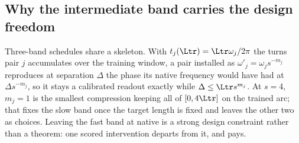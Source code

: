 
\subsection{Why the intermediate band carries the design freedom}
\label{sec:three-band-chain}

Three-band schedules share a skeleton. With $t_j(\Ltr)=\Ltr\omega_j/2\pi$ the turns pair $j$
accumulates over the training window, a pair installed as $\omega'_j=\omega_j s^{-m_j}$
reproduces at separation $\Delta$ the phase its native frequency would have had at
$\Delta s^{-m_j}$, so it stays a calibrated readout exactly while $\Delta\le\Ltr s^{m_j}$. At
$s=4$, $m_j=1$ is the smallest compression keeping all of $[0,4\Ltr]$ on the trained arc; that
fixes the slow band once the target length is fixed and leaves the other two as choices. Leaving
the fast band at native is a strong design constraint rather than a theorem: one scored
intervention departs from it, and pays.

